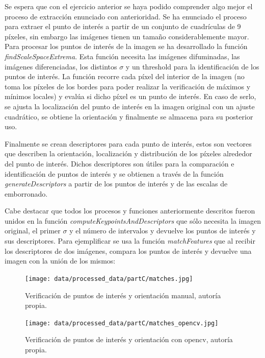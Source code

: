 \documentclass[a4paper,12pt]{article}
\begin{document}
{\vspace{0.5cm}

Se espera que con el ejercicio anterior se haya podido comprender algo mejor el proceso de extracción enunciado con anterioridad. Se ha enunciado el proceso para extraer el punto de interés a partir
de un conjunto de cuadrículas de 9 píxeles, sin embargo las imágenes tienen un tamaño considerablemente mayor. Para procesar los puntos de interés de la imagen se ha desarrollado la función \textit{findScaleSpaceExtrema}.
Esta función necesita las imágenes difuminadas, las imágenes diferenciadas, los distintos $\sigma$ y un threshold para la identificación de los puntos de interés. La función recorre cada píxel del interior de la imagen
(no toma los píxeles de los bordes para poder realizar la verificación de máximos y mínimos locales) y evalúa si dicho píxel es un punto de interés. En caso de serlo, se ajusta la localización del punto de interés
en la imagen original con un ajuste cuadrático, se obtiene la orientación y finalmente se almacena para su posterior uso.

\vspace{0.5cm}

Finalmente se crean descriptores para cada punto de interés, estos son vectores que describen la orientación, localización y distribución de los píxeles alrededor del punto de interés. Dichos descriptores 
son útiles para la comparación e identificación de puntos de interés y se obtienen a través de la función \textit{generateDescriptors} a partir de los puntos de interés y de las escalas de emborronado.

\vspace{0.5cm}

Cabe destacar que todos los procesos y funciones anteriormente descritos fueron unidos en la función \textit{computeKeypointsAndDescriptors} que sólo necesita la imagen original, el primer $\sigma$ y el número de intervalos
y devuelve los puntos de interés y sus descriptores. Para ejemplificar se usa la función \textit{matchFeatures} que al recibir los descriptores de dos imágenes, compara los puntos de interés y devuelve una imagen con la unión de 
los mismos:

\vspace{0.5cm}

\begin{figure}[h!]
    \centering
    \begin{minipage}[b]{0.4\textwidth}
        \centering
        \texttt{[image: data/processed\_data/partC/matches.jpg]}
        \caption{Verificación de puntos de interés y orientación manual, autoría propia.}
        \label{fig:keypoints-detection}
    \end{minipage}
    \hfill
    \begin{minipage}[b]{0.4\textwidth}
        \centering
        \texttt{[image: data/processed\_data/partC/matches\_opencv.jpg]}
        \caption{Verificación de puntos de interés y orientación con opencv, autoría propia.}
        \label{fig:keypoints-detection-opencv}
    \end{minipage}
\end{figure}

}
\end{document}
